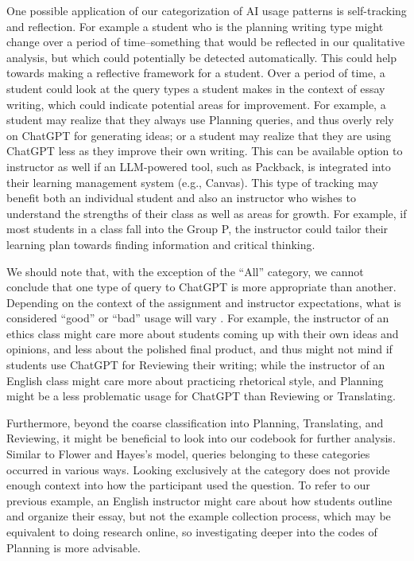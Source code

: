 \documentclass[manuscript,screen,acmsmall]{acmart}
\begin{document}
    One possible application of our categorization of AI usage patterns is self-tracking and reflection.
    For example a student who is the planning writing type might change over a period of time--something that would be reflected in our qualitative analysis, but which could potentially be detected automatically.
    This could help towards making a reflective framework for a student.
    Over a period of time, a student could look at the query types a student makes in the context of essay writing, which could indicate potential areas for improvement.
    For example, a student may realize that they always use Planning queries, and thus overly rely on ChatGPT for generating ideas; or a student may realize that they are using ChatGPT less as they improve their own writing.
    This can be available option to instructor as well if an LLM-powered tool, such as Packback, is integrated into their learning management system (e.g., Canvas). 
    This type of tracking may benefit both an individual student and also an instructor who wishes to understand the strengths of their class as well as areas for growth. 
    For example, if most students in a class fall into the Group P, the instructor could tailor their learning plan towards finding information and critical thinking.

    We should note that, with the exception of the ``All'' category, we cannot conclude that one type of query to ChatGPT is more appropriate than another.
    Depending on the context of the assignment and instructor expectations, what is considered ``good'' or ``bad'' usage will vary .
    For example, the instructor of an ethics class might care more about students coming up with their own ideas and opinions, and less about the polished final product, and thus might not mind if students use ChatGPT for Reviewing their writing; while the instructor of an English class might care more about practicing rhetorical style, and Planning might be a less problematic usage for ChatGPT than Reviewing or Translating.

    Furthermore, beyond the coarse classification into Planning, Translating, and Reviewing, it might be beneficial to look into our codebook for further analysis.
    Similar to Flower and Hayes's model, queries belonging to these categories occurred in various ways.
    Looking exclusively at the category does not provide enough context into how the participant used the question.
    To refer to our previous example, an English instructor might care about how students outline and organize their essay, but not the example collection process, which may be equivalent to doing research online, so investigating deeper into the codes of Planning is more advisable.
    
\end{document}
